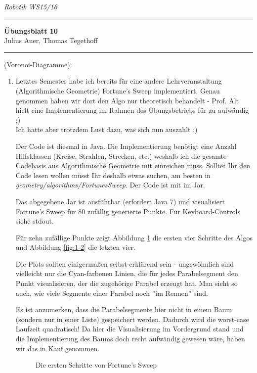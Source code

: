 \documentclass[a4paper, titlepage=false, parskip=full-, 10pt]{scrartcl}
\newcounter{tasknbr}
\newenvironment{task}[1]{{\bf Aufgabe \arabic {tasknbr}\stepcounter{tasknbr}} (#1):\begin{enumerate}}{\end{enumerate}}
\newcommand{\lecture}{Robotik WS15/16}
\newcommand{\tutor}{}
\newcommand{\assignmentnbr}{10}
\newcommand{\students}{Julius Auer, Thomas Tegethoff}
\begin{document}
  
{\small \textsl{\lecture \hfill \tutor}}
\hrule
\begin{center}
\textbf{Übungsblatt \assignmentnbr}\\
[\bigskipamount]
{\small \students}
\end{center}
\hrule

\begin{task}{Voronoi-Diagramme}
\item[]
Letztes Semester habe ich bereits für eine andere Lehrveranstaltung (Algorithmische Geometrie) Fortune's Sweep implementiert. Genau genommen haben wir dort den Algo nur theoretisch behandelt - Prof. Alt hielt eine Implementierung im Rahmen des Übungsbetriebs für zu aufwändig ;)\\
Ich hatte aber trotzdem Lust dazu, was sich nun auszahlt :)

Der Code ist diesmal in Java. Die Implementierung benötigt eine Anzahl Hilfsklassen (Kreise, Strahlen, Strecken, etc.) weshalb ich die gesamte Codebasis aus Algorithmische Geometrie mit einreichen muss. Solltet Ihr den Code lesen wollen müsst Ihr deshalb etwas suchen, am besten in \emph{geometry/algorithms/FortunesSweep}. Der Code ist mit im Jar.

Das abgegebene Jar ist ausführbar (erfordert Java 7) und visualisiert Fortune's Sweep für 80 zufällig generierte Punkte. Für Keyboard-Controls siehe stdout.

Für zehn zufällige Punkte zeigt Abbildung \ref{fig:1-1} die ersten vier Schritte des Algos und Abbildung \ref{fig:1-2} die letzten vier.

Die Plots sollten einigermaßen selbst-erklärend sein - ungewöhnlich sind vielleicht nur die Cyan-farbenen Linien, die für jedes Parabelsegment den Punkt visualisieren, der die zugehörige Parabel erzeugt hat. Man sieht so auch, wie viele Segmente einer Parabel noch ''im Rennen'' sind.

Es ist anzumerken, dass die Parabelsegmente hier nicht in einem Baum (sondern nur in einer Liste) gespeichert werden. Dadurch wird die worst-case Laufzeit quadratisch! Da hier die Visualisierung im Vordergrund stand und die Implementierung des Baums doch recht aufwändig gewesen wäre, haben wir das in Kauf genommen.

\begin{figure}[!htpb]
\centering
{}
\caption{Die ersten Schritte von Fortune's Sweep}
\label{fig:1-1}
\end{figure}


\end{task}
\end{document}
